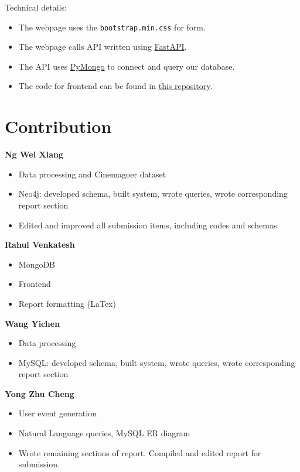 \documentclass[10pt,titlepage]{article}
\begin{document}
Technical details:
\begin{itemize}
    \item The webpage uses the \texttt{bootstrap.min.css} for form.
    \item The webpage calls API written using \href{https://fastapi.tiangolo.com/}{FastAPI}.
    \item The API uses \href{https://pypi.org/project/pymongo/}{PyMongo} to connect and query our database.
    \item The code for frontend can be found in \href{https://github.com/recurze/MiniMovieDB}{this repository}.
\end{itemize}

\section{Contribution}

\textbf{Ng Wei Xiang}
\begin{itemize}
    \item Data processing and Cinemagoer dataset 

    \item Neo4j: developed schema, built system, wrote queries, wrote corresponding report section 

    \item Edited and improved all submission items, including codes and schemas
\end{itemize}

\textbf{Rahul Venkatesh}
\begin{itemize}
    \item MongoDB
    \item Frontend
    \item Report formatting (LaTex)
\end{itemize}

\textbf{Wang Yichen}
\begin{itemize}
    \item Data processing
    \item MySQL: developed schema, built system, wrote queries, wrote corresponding report section
\end{itemize}

\textbf{Yong Zhu Cheng}
\begin{itemize}
    \item User event generation
    \item Natural Language queries, MySQL ER diagram
    \item Wrote remaining sections of report. Compiled and edited report for submission.
\end{itemize}
\end{document}
